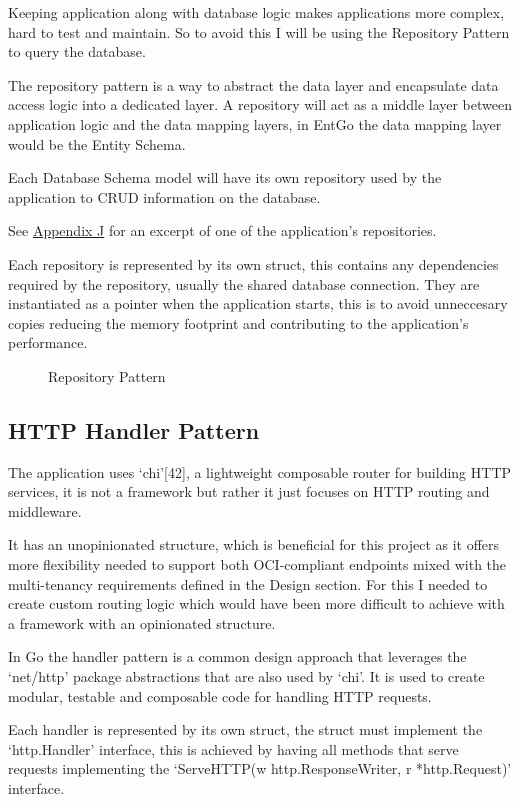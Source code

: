 \documentclass{article}
\newcommand{\widefig}[3][1.2\textwidth]{%
  \begin{figure}[H]
    \makebox[\textwidth][c]{%
      \texttt{[image: \#2]}%
    }
    \caption{#3}
  \end{figure}
}
\begin{document}
  Keeping application along with database logic makes applications more complex, hard to test and maintain. So to avoid this I will be using the Repository Pattern to query the database.

  The repository pattern is a way to abstract the data layer and encapsulate data access logic into a dedicated layer. A repository will act as a middle layer between application logic and the data mapping layers, in EntGo the data mapping layer would be the Entity Schema.

  Each Database Schema model will have its own repository used by the application to CRUD information on the database.

  See \hyperref[sec:appendix-j]{Appendix J} for an excerpt of one of the application's repositories.

  Each repository is represented by its own struct, this contains any dependencies required by the repository, usually the shared database connection. They are instantiated as a pointer when the application starts, this is to avoid unneccesary copies reducing the memory footprint and contributing to the application's performance.

  \widefig{repository_pattern.png}{Repository Pattern}

  \subsection{HTTP Handler Pattern}

  The application uses `chi'[42], a lightweight composable router for building HTTP services, it is not a framework but rather it just focuses on HTTP routing and middleware.

  It has an unopinionated structure, which is beneficial for this project as it offers more flexibility needed to support both OCI-compliant endpoints mixed with the multi-tenancy requirements defined in the Design section. For this I needed to create custom routing logic which would have been more difficult to achieve with a framework with an opinionated structure.

  In Go the handler pattern is a common design approach that leverages the `net/http' package abstractions that are also used by `chi'. It is used to create modular, testable and composable code for handling HTTP requests.
  
  Each handler is represented by its own struct, the struct must implement the `http.Handler' interface, this is achieved by having all methods that serve requests implementing the `ServeHTTP(w http.ResponseWriter, r *http.Request)' interface.
\end{document}
